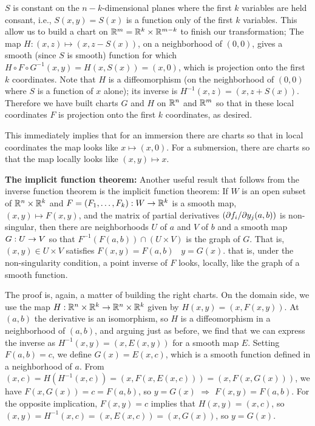 $S$ is constant on the $n-k$-dimensional planes where the first $k$ variables are held consant,
i.e., $S(x,y)=S(x)$ is a function only of the first $k$ variables. This allow us to build a
chart on ${\Bbb R}^m={\Bbb R}^k\times {\Bbb R}^{m-k}$ to finish our transformation; The map
$H:(x,z)\mapsto (x,z-S(x))$, on a neighborhood of $(0,0)$, gives a smooth (since $S$ is smooth)
function for which $H\circ F\circ G^{-1}(x,y)=H(x,S(x))=(x,0)$,
which is projection onto the first $k$ coordinates. Note that $H$ is a diffeomorphism
(on the neighborhood of $(0,0)$ where $S$ is a function of $x$ alone); its inverse is
$H^{-1}(x,z)=(x,z+S(x))$. Therefore we have built charts $G$ and $H$ on ${\Bbb R}^n$ and ${\Bbb R}^m$
so that in these local coordinates $F$ is projection onto the first $k$ coordinates, as desired.

\ssk

This immediately implies that for an immersion there are charts so that in local coordinates
the map looks like $x\mapsto (x,0)$. For a submersion, there are charts so that the map locally
looks like $(x,y)\mapsto x$.

\msk

{\bf The implicit function theorem:} Another useful result that follows from the inverse function theorem is the implicit function
theorem: If $W$ is an open subset of ${\Bbb R}^n\times {\Bbb R}^k$ and $F=(F_1,\ldots,F_k):W\rightarrow {\Bbb R}^k$ is a smooth map,
$(x,y)\mapsto F(x,y)$, and the matrix of partial derivatives $(\partial f_i/\partial y_j(a,b))$ is non-singular,
then there are neighborhoods $U$ of $a$ and $V$ of $b$ and a smooth map $G:U\rightarrow V$ so that
$F^{-1}(F(a,b))\cap(U\times V)$ is the graph of $G$. That is, $(x,y)\in U\times V$ satisfies $F(x,y)=F(a,b)$
\lra\ $y=G(x)$. that is, under the non-singularity condition, a point inverse of $F$ looks, locally, like the
graph of a smooth function.

\ssk

The proof is, again, a matter of building the right charts. On the domain side, we use
the map $H:{\Bbb R}^n\times {\Bbb R}^k\rightarrow {\Bbb R}^n\times {\Bbb R}^k$ given by $H(x,y)=(x,F(x,y))$.
At $(a,b)$ the derivative is an isomorphism, so $H$ is a diffeomorphism in a neighborhood
of $(a,b)$, and arguing just as before, we find that we can express the inverse as
$H^{-1}(x,y)=(x,E(x,y))$ for a smooth map $E$. Setting $F(a,b)=c$, we define
$G(x)=E(x,c)$, which is a smooth function defined in a neighborhood of $a$. From 
$(x,c)=H(H^{-1}(x,c))=(x,F(x,E(x,c)))=(x,F(x,G(x)))$, we have $F(x,G(x))=c=F(a,b)$, 
so $y=G(x)$ $\Rightarrow$ $F(x,y)=F(a,b)$. For the opposite implication, 
$F(x,y)=c$ implies that $H(x,y)=(x,c)$, so $(x,y)=H^{-1}(x,c)=(x,E(x,c))=(x,G(x))$, so $y=G(x)$.

